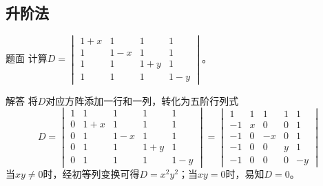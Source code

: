 \documentclass[9pt,xcolor=svgnames]{beamer} %
\begin{document}
\subsection*{升阶法}
\begin{frame}
    \begin{block}{题面}
        计算\(D=\begin{vmatrix}1+x&1&1&1\\1&1-x&1&1\\1&1&1+y&1\\1&1&1&1-y\end{vmatrix}\)。
    \end{block}
    \pause
    \begin{block}{解答}
        将\(D\)对应方阵添加一行和一列，转化为五阶行列式
        \begin{equation*}
            D=
            \begin{vmatrix}
                1 & 1   & 1   & 1   & 1   \\
                0 & 1+x & 1   & 1   & 1   \\
                0 & 1   & 1-x & 1   & 1   \\
                0 & 1   & 1   & 1+y & 1   \\
                0 & 1   & 1   & 1   & 1-y
            \end{vmatrix}=
            \begin{vmatrix}
                1  & 1 & 1  & 1 & 1  \\
                -1 & x & 0  & 0 & 1  \\
                -1 & 0 & -x & 0 & 1  \\
                -1 & 0 & 0  & y & 1  \\
                -1 & 0 & 0  & 0 & -y
            \end{vmatrix}
        \end{equation*}
        当\(xy\neq0\)时，经初等列变换可得\(D=x^2y^2\)；当\(xy=0\)时，易知\(D=0\)。
    \end{block}
\end{frame}
\end{document}
